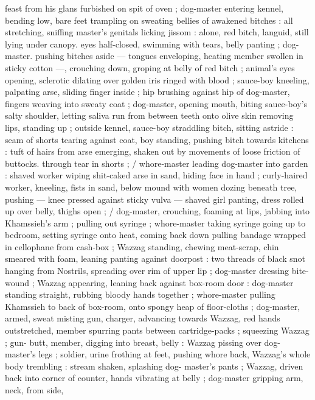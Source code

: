 feast from his glans furbished on spit of oven{\thd} {\gr} ; dog-master 
entering kennel, bending low, bare feet trampling on sweating bellies 
of awakened bitches : all stretching, sniffing master's genitals 
licking jissom : alone, red bitch, languid, still lying under canopy. 
eyes half-closed, swimming with tears, belly panting ; dog-master. 
pushing bitches aside --- tongues enveloping, heating member 
swollen in sticky cotton ---, crouching down, groping at belly of red 
bitch ; animal's eyes opening, sclerotic dilating over golden iris 
ringed with blood ; sauce-boy kneeling, palpating arse, sliding finger 
inside ; hip brushing against hip of dog-master, fingers weaving into 
sweaty coat ; dog-master, opening mouth, biting sauce-boy's salty 
shoulder, letting saliva run from between teeth onto olive skin 
removing lips, standing up ; outside kennel, sauce-boy straddling 
bitch, sitting astride : seam of shorts tearing against coat, boy 
standing, pushing bitch towards kitchens : tuft of hairs from arse 
emerging, shaken out by movements of loose friction of buttocks. 
through tear in shorts ; {\slash} whore-master leading dog-master into 
garden : shaved worker wiping shit-caked arse in sand, hiding face 
in hand ; curly-haired worker, kneeling, fists in sand, below mound 
with women dozing beneath tree, pushing --- knee pressed against 
sticky vulva --- shaved girl panting, dress rolled up over belly, thighs 
open ; {\slash} dog-master, crouching, foaming at lips, jabbing into 
Khamssieh's arm ; pulling out syringe ; whore-master taking syringe 
going up to bedroom, setting syringe onto heat, coming back down 
pulling bandage wrapped in cellophane from cash-box ; Wazzag 
standing, chewing meat-scrap, chin smeared with foam, leaning 
panting against doorpost : two threads of black snot hanging from 
Nostrils, spreading over rim of upper lip ; dog-master dressing bite- 
wound ; Wazzag appearing, leaning back against box-room door : 
dog-master standing straight, rubbing bloody hands together ; 
whore-master pulling Khamssieh to back of box-room, onto spongy 
heap of floor-cloths ; dog-master, armed, sweat misting gun, charger, 
advancing towards Wazzag, red hands outstretched, member 
spurring pants between cartridge-packs ; squeezing Wazzag ; gun- 
butt, member, digging into breast, belly : Wazzag pissing over dog- 
master's legs ; soldier, urine frothing at feet, pushing whore back, 
Wazzag's whole body trembling : stream shaken, splashing dog- 
master's pants ; Wazzag, driven back into corner of counter, hands 
vibrating at belly ; dog-master gripping arm, neck, from side, 
